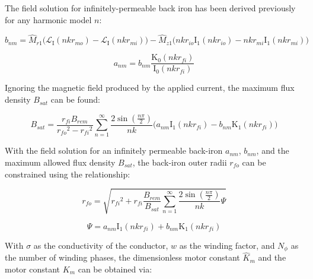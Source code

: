         
        The field solution for infinitely-permeable back iron has been derived previously\,\cite{ruddy2014} for any harmonic model $n$:


        \begin{equation}
            b_{nm}=\hat{M}_{r1}\Big(\mathcal{L}_{\mathrm{I}}(nkr_{mo})
            -\mathcal{L}_{\mathrm{I}}(nkr_{mi})\Big)-\hat{M}_{z1}\Big(nkr_{io}\mathrm{I}_1(nkr_{io})-nkr_{mi}\mathrm{I}_1(nkr_{mi})\Big)
            \label{eq:bnm}
        \end{equation}
        
        
        \begin{equation}
            a_{nm}=b_{nm}\frac{\mathrm{K}_0(nkr_{fi})}{\mathrm{I}_0(nkr_{fi})}
            \label{eq:anm}
        \end{equation}
        
        
        Ignoring the magnetic field produced by the applied current, the maximum flux density $B_{sat}$ can be found:
        

        \begin{equation}
            B_{sat}=\frac{r_{fi} B_{rem}}{{r_{fo}}^2-{r_{fi}}^2}\sum_{n=1}^\infty\frac{2\sin \left(\frac{n\pi}{2}\right)}{nk}\Big(a_{nm}\mathrm{I}_{1}(nkr_{fi})-b_{nm}\mathrm{K}_{1}(nkr_{fi})\Big)
            \label{eq:Bsat}
        \end{equation}
        
        
        With the field solution for an infinitely permeable back-iron $a_{nm}$, $b_{nm}$, and the maximum allowed flux density $B_{sat}$, the back-iron outer radii $r_{fo}$ can be constrained using the relationship:


        \begin{equation}
            r_{fo}=\sqrt{{r_{fi}}^2+r_{fi}\frac{B_{rem}}{B_{sat}}\sum_{n=1}^\infty{\frac{{2\sin ( {\frac{{n\pi }}{2}} )}}{{nk}}\Psi }}
            \label{eq:r_fo}
        \end{equation}
        
        \begin{equation}
            \Psi  = {a_{nm}}{{\textrm{I}}_{\textrm{1}}}\left( {nk{r_{fi}}} \right) + {b_{nm}}{{\textrm{K}}_{\textrm{1}}}\left( {nk{r_{fi}}} \right)
            \label{eq:psi}
        \end{equation}
        
        
        With $\sigma$ as the conductivity of the conductor, $w$ as the winding factor, and $N_{\phi}$ as the number of winding phases, the dimensionless motor constant ${\hat K}_m$ and the motor constant $K_m$ can be obtained via:


